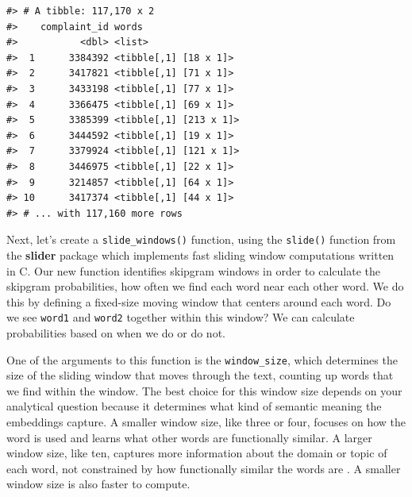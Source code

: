 \documentclass[
]{krantz}
\begin{document}
\begin{verbatim}
#> # A tibble: 117,170 x 2
#>    complaint_id words                 
#>           <dbl> <list>                
#>  1      3384392 <tibble[,1] [18 x 1]> 
#>  2      3417821 <tibble[,1] [71 x 1]> 
#>  3      3433198 <tibble[,1] [77 x 1]> 
#>  4      3366475 <tibble[,1] [69 x 1]> 
#>  5      3385399 <tibble[,1] [213 x 1]>
#>  6      3444592 <tibble[,1] [19 x 1]> 
#>  7      3379924 <tibble[,1] [121 x 1]>
#>  8      3446975 <tibble[,1] [22 x 1]> 
#>  9      3214857 <tibble[,1] [64 x 1]> 
#> 10      3417374 <tibble[,1] [44 x 1]> 
#> # ... with 117,160 more rows
\end{verbatim}

Next, let's create a \texttt{slide\_windows()} function, using the \texttt{slide()} function from the \textbf{slider} package \citep{Vaughan2020} which implements fast sliding window computations written in C. Our new function identifies skipgram windows in order to calculate the skipgram probabilities, how often we find each word near each other word. We do this by defining a fixed-size moving window that centers around each word. Do we see \texttt{word1} and \texttt{word2} together within this window? We can calculate probabilities based on when we do or do not.

One of the arguments to this function is the \texttt{window\_size}, which determines the size of the sliding window that moves through the text, counting up words that we find within the window. The best choice for this window size depends on your analytical question because it determines what kind of semantic meaning the embeddings capture. A smaller window size, like three or four, focuses on how the word is used and learns what other words are functionally similar. A larger window size, like ten, captures more information about the domain or topic of each word, not constrained by how functionally similar the words are \citep{Levy2014}. A smaller window size is also faster to compute.
\end{document}
